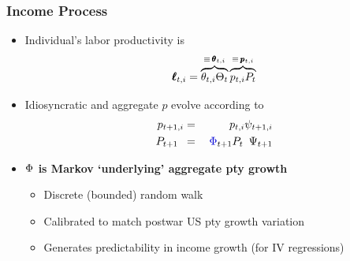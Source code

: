 \documentclass{beamer}\usepackage{dcolumn}
\newcommand{\jemph}[1]{{\color{StataDarkBlue}#1}}
\newcommand{\jbemph}[1]{\textbf{\color{SlideNavy}#1}}
\providecommand{\jemph}[1]{{\color{jirkasblue}#1}}
\begin{document}
\begin{frame}
\frametitle{Income Process}

\begin{itemize}
\item  Individual's labor productivity is
$$
\pmb{\ell}_{t,i} = \overbrace{\theta_{t,i}\Theta_{t}}^{\equiv\,\pmb{\theta}_{t,i}}\overbrace{{p}_{t,i} {P}_{t}}^{\equiv\, \pmb{p}_{t,i}}
$$

\item  Idiosyncratic and aggregate $p$ evolve according to
\begin{eqnarray*}
{{p}}_{t+1,i} & =&  \phantom{\jemph{\PtyGro}_{t+1}}{{p}}_{t,i} \psi_{t+1,i}  \\
 {P}_{t+1\phantom{,i}} & =&  \jemph{\PtyGro}_{t+1} {P}_{t\phantom{,i}}\Psi_{t+1}
\end{eqnarray*}


  \item \jbemph{$\Phi$ is Markov `underlying' aggregate pty growth}
    \begin{itemize}
    \setlength{\itemsep}{1mm}
    \item Discrete (bounded) random walk
    \item Calibrated to match postwar US pty growth variation
    \item Generates predictability in income growth (for IV regressions)
    \end{itemize}
  \end{itemize}
\end{frame}
\end{document}

